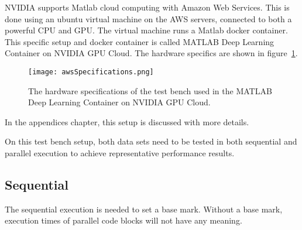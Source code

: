 NVIDIA supports Matlab cloud computing with Amazon Web Services.
This is done using an ubuntu virtual machine on the AWS servers, connected to both a powerful CPU and GPU.
The virtual machine runs a Matlab docker container.\cite{MATLABDe46:online}
This specific setup and docker container is called MATLAB Deep Learning Container on NVIDIA GPU Cloud.
The hardware specifics are shown in figure~\ref{fig:awsspec}.
\begin{figure}[H]
	\centering
	\texttt{[image: awsSpecifications.png]}
	\caption{The hardware specifications of the test bench used in the MATLAB Deep Learning Container on NVIDIA GPU Cloud.}
	\label{fig:awsspec}
\end{figure}
In the appendices chapter, this setup is discussed with more details.
\par 
On this test bench setup, both data sets need to be tested in both sequential and parallel execution to achieve representative performance results.
\subsection{Sequential}
The sequential execution is needed to set a base mark.
Without a base mark, execution times of parallel code blocks will not have any meaning. 
